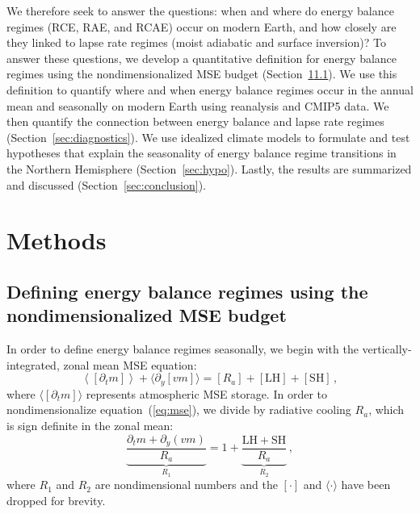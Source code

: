 \documentclass{ametsocV5}
\begin{document}
We therefore seek to answer the questions: when and where do energy balance regimes (RCE, RAE, and RCAE) occur on modern Earth, and how closely are they linked to lapse rate regimes (moist adiabatic and surface inversion)? To answer these questions, we develop a quantitative definition for energy balance regimes using the nondimensionalized MSE budget (Section~\ref{sec:methods}\ref{subsec:mse}). We use this definition to quantify where and when energy balance regimes occur in the annual mean and seasonally on modern Earth using reanalysis and CMIP5 data. We then quantify the connection between energy balance and lapse rate regimes (Section~\ref{sec:diagnostics}). We use idealized climate models to formulate and test hypotheses that explain the seasonality of energy balance regime transitions in the Northern Hemisphere (Section~\ref{sec:hypo}). Lastly, the results are summarized and discussed (Section~\ref{sec:conclusion}).

\section{Methods}\label{sec:methods}
    \subsection{Defining energy balance regimes using the nondimensionalized MSE budget} \label{subsec:mse}
    In order to define energy balance regimes seasonally, we begin with the vertically-integrated, zonal mean MSE equation:
    \begin{equation} \label{eq:mse}
        \left\langle\left[\partial_t m\right]\right\rangle + \langle\partial_y [vm]\rangle = [R_{a}] + \mathrm{[LH]+[SH]} \, ,
    \end{equation}
    where $\langle[\partial_t m]\rangle$ represents atmospheric MSE storage. In order to nondimensionalize equation~(\ref{eq:mse}), we divide by radiative cooling $R_a$, which is sign definite in the zonal mean:
    \begin{equation}
        {\underbrace{\frac{\partial_t m + \partial_y (vm)}{R_{a}}}_{R_1}} = 1 + {\underbrace{\frac{\mathrm{LH+SH}}{R_{a}}}_{R_2}} \, ,
    \end{equation}
    where $R_1$ and $R_2$ are nondimensional numbers and the $[\cdot]$ and $\langle\cdot\rangle$ have been dropped for brevity. 
\end{document}
